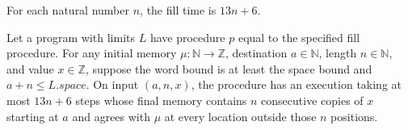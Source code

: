 \begin{definition}
\label{Light.fillTime}
\leanok
For each natural number $n$, the fill time is $13n+6$.
\end{definition}

\begin{theorem}
\label{Light.fill_meets}
\leanok
{}
Let a program with limits $L$ have procedure $p$ equal to the specified fill procedure.
For any initial memory $\mu:\mathbb N\to\mathbb Z$, destination $a\in\mathbb N$, length
$n\in\mathbb N$, and value $x\in\mathbb Z$, suppose the word bound is at least the space
bound and $a+n\le L.space$. On input $(a,n,x)$, the procedure has an execution taking at
most $13n+6$ steps whose final memory contains $n$ consecutive copies of $x$ starting at
$a$ and agrees with $\mu$ at every location outside those $n$ positions.
\end{theorem}
